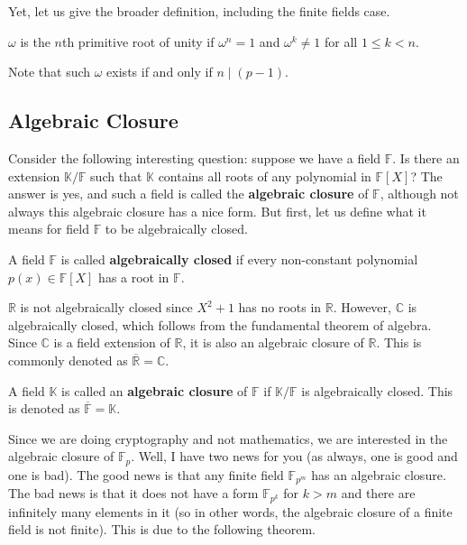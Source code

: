 \documentclass[../lecture-notes-148x210.tex]{subfiles}
\begin{document}
Yet, let us give the broader definition, including the finite fields case.

\begin{definition}
    $\omega$ is the $n$th primitive root of unity if $\omega^n=1$ and $\omega^k \neq 1$ for all $1 \leq k < n$.
\end{definition}

Note that such $\omega$ exists if and only if $n \mid (p-1)$. 

\subsection{Algebraic Closure}

Consider the following interesting question: suppose we have a field $\mathbb{F}$. Is there an extension $\mathbb{K}/\mathbb{F}$ such that $\mathbb{K}$ contains all roots of any polynomial in $\mathbb{F}[X]$? The answer is yes, and such a field is called the \textbf{algebraic closure} of $\mathbb{F}$, although not always this algebraic closure has a nice form. But first, let us define what it means for field $\mathbb{F}$ to be algebraically closed.

\vspace{-0.75em}

\begin{definition}
    A field $\mathbb{F}$ is called \textbf{algebraically closed} if every non-constant polynomial $p(x) \in \mathbb{F}[X]$ has a root in $\mathbb{F}$.
\end{definition}

\begin{example}
    $\mathbb{R}$ is not algebraically closed since $X^2+1$ has no roots in $\mathbb{R}$. However, $\mathbb{C}$ is algebraically closed, which follows from the fundamental theorem of algebra. Since $\mathbb{C}$ is a field extension of $\mathbb{R}$, it is also an algebraic closure of $\mathbb{R}$. This is commonly denoted as $\overline{\mathbb{R}} = \mathbb{C}$.
\end{example}

\begin{definition}
    A field $\mathbb{K}$ is called an \textbf{algebraic closure} of $\mathbb{F}$ if $\mathbb{K}/\mathbb{F}$ is algebraically closed. This is denoted as $\overline{\mathbb{F}} = \mathbb{K}$.
\end{definition}

Since we are doing cryptography and not mathematics, we are interested in the algebraic closure of $\mathbb{F}_p$. Well, I have two news for you (as always, one is good and one is bad). The good news is that any finite field $\mathbb{F}_{p^m}$ has an algebraic closure. The bad news is that it does not have a form $\mathbb{F}_{p^k}$ for $k>m$ and there are infinitely many elements in it (so in other words, the algebraic closure of a finite field is not finite). This is due to the following theorem.
\end{document}
